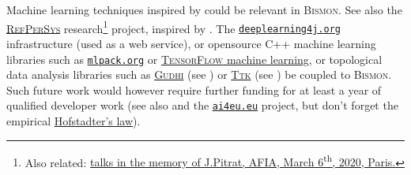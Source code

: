 Machine learning techniques inspired by \cite{zhang:2019:learned}
could be relevant in \textsc{Bismon}. See also the
\href{http://refpersys.org/}{\textsc{RefPerSys}}  research\footnote{Also related:
\href{https://afia.asso.fr/journee-hommage-j-pitrat/}{talks in the
  memory of J.Pitrat, AFIA, March 6\textsuperscript{th}, 2020,
  Paris.}} project, inspired by \cite{Pitrat:1996:FGCS,
  Pitrat:2009:AST, Pitrat:2009:ArtifBeings,
  Starynkevitch-1990-EUM}. The 
\href{https://deeplearning4j.org/}{\texttt{deeplearning4j.org}}
infrastructure (used as a web service), or opensource C++ machine
learning libraries such as   \href{https://mlpack.org}{\texttt{mlpack.org}}
or \href{https://www.tensorflow.org/}{\textsc{TensorFlow} machine
  learning}, or  topological data analysis libraries such as
\href{https://gudhi.inria.fr/}{\textsc{Gudhi}} (see
\cite{gudhi:2020:urm, gudhi:2020:PersistentCohomology,
  gudhi:2020:RipsComplex}) or
\href{https://topology-tool-kit.github.io/}{\textsc{Ttk}} (see
\cite{Masood:2019:ttk}) be coupled to \textsc{Bismon}. Such future
work would however require further funding for at least a year of
qualified developer work (see also
\cite{Maglogiannis:2007:emerging-ai-app} and
 the
\href{https://www.ai4eu.eu/}{\texttt{ai4eu.eu}} project, but don't
forget the empirical
\href{https://en.wikipedia.org/wiki/Hofstadter\%27s\_law}{Hofstadter's
  law}).

\medskip

